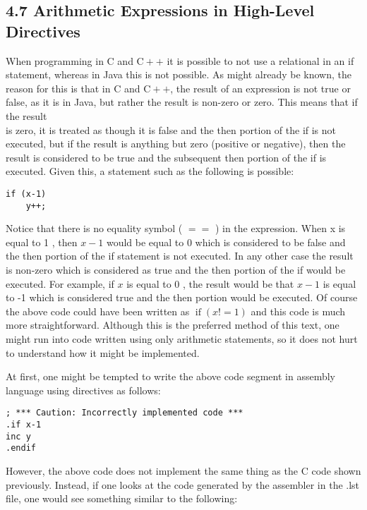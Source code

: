 \documentclass[10pt]{article}
\begin{document}
\subsection*{4.7 Arithmetic Expressions in High-Level Directives}
When programming in C and $\mathrm{C}++$ it is possible to not use a relational in an if statement, whereas in Java this is not possible. As might already be known, the reason for this is that in C and $\mathrm{C}++$, the result of an expression is not true or false, as it is in Java, but rather the result is non-zero or zero. This means that if the result\\
is zero, it is treated as though it is false and the then portion of the if is not executed, but if the result is anything but zero (positive or negative), then the result is considered to be true and the subsequent then portion of the if is executed. Given this, a statement such as the following is possible:

\begin{verbatim}
if (x-1)
    y++;
\end{verbatim}

Notice that there is no equality symbol ( $==$ ) in the expression. When x is equal to 1 , then $x-1$ would be equal to 0 which is considered to be false and the then portion of the if statement is not executed. In any other case the result is non-zero which is considered as true and the then portion of the if would be executed. For example, if $x$ is equal to 0 , the result would be that $x-1$ is equal to -1 which is considered true and the then portion would be executed. Of course the above code could have been written as $\operatorname{if}(x!=1)$ and this code is much more straightforward. Although this is the preferred method of this text, one might run into code written using only arithmetic statements, so it does not hurt to understand how it might be implemented.

At first, one might be tempted to write the above code segment in assembly language using directives as follows:

\begin{verbatim}
; *** Caution: Incorrectly implemented code ***
.if x-1
inc y
.endif
\end{verbatim}

However, the above code does not implement the same thing as the C code shown previously. Instead, if one looks at the code generated by the assembler in the .lst file, one would see something similar to the following:
\end{document}
